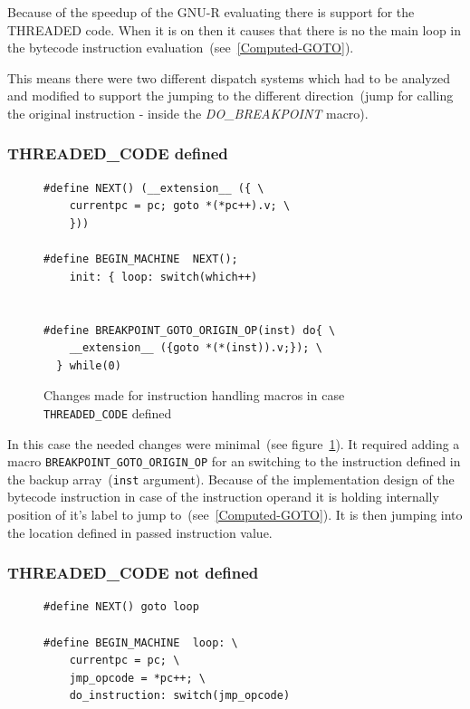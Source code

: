 \documentclass[thesis=M,english]{FITthesis}[2018/10/20]
\newcommand{\code}[1]{\texttt{#1}}
\begin{document}
{Because of the speedup of the GNU-R evaluating there is support for the THREADED code. When it is on then it causes that there is no the main loop in the bytecode instruction evaluation~(see~\ref{Computed-GOTO}). 

This means there were two different dispatch systems which had to be analyzed and modified to support the jumping to the different direction~(jump for calling the original instruction - inside the \textit{DO{\_}BREAKPOINT} macro).

\subsubsection{THREADED{\_}CODE defined}

\begin{figure}[h]
\begin{lstlisting}
#define NEXT() (__extension__ ({ \
    currentpc = pc; goto *(*pc++).v; \
    }))

#define BEGIN_MACHINE  NEXT(); 
    init: { loop: switch(which++)


#define BREAKPOINT_GOTO_ORIGIN_OP(inst) do{ \
    __extension__ ({goto *(*(inst)).v;}); \
  } while(0)
\end{lstlisting}
	\caption{Changes made for instruction handling macros in case \code{THREADED{\_}CODE} defined}\label{fig:instruction-handling-threaded}
\end{figure}

In this case the needed changes were minimal~(see figure~\ref{fig:instruction-handling-threaded}). It required adding a macro \code{BREAKPOINT{\_}GOTO{\_}ORIGIN{\_}OP} for an switching to the instruction defined in the backup array~(\code{inst} argument). Because of the implementation design of the bytecode instruction in case of the instruction operand it is holding internally position of it's label to jump to~(see~\ref{Computed-GOTO}). It is then jumping into the location defined in passed instruction value.


\subsubsection{THREADED{\_}CODE not defined}

\begin{figure}[h]
\begin{lstlisting}
#define NEXT() goto loop

#define BEGIN_MACHINE  loop: \
    currentpc = pc; \
    jmp_opcode = *pc++; \
    do_instruction: switch(jmp_opcode)


\end{lstlisting}
\end{figure}}
\end{document}

